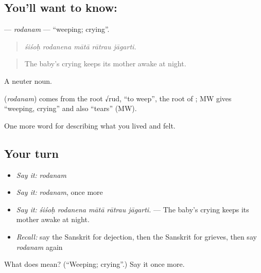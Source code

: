 \subsection*{You'll want to know: }
\textbf{} — \emph{rodanam} — \textquotedblleft{}weeping; crying\textquotedblright{}.

\begin{quote}
    
\end{quote}

\begin{quote}
\emph{śiśoḥ rodanena mātā rātrau jāgarti.}
\end{quote}

\begin{quote}
The baby's crying keeps its mother awake at night.
\end{quote}

A neuter noun.

\begin{cousinweb}
\textbf{} (\emph{rodanam}) comes from the root √rud, \textquotedblleft{}to weep\textquotedblright{}, the root of \textbf{}; MW gives \textquotedblleft{}weeping, crying\textquotedblright{} and also \textquotedblleft{}tears\textquotedblright{} (MW).
\end{cousinweb}

\begin{grammarlens}[title={What you've built}]
One more word for describing what you lived and felt.
\end{grammarlens}

\subsection*{Your turn}
\begin{itemize}
\raggedright
  \item \emph{Say it:} \emph{rodanam}
  \item \emph{Say it:} \emph{rodanam}, once more
  \item \emph{Say it:} \emph{śiśoḥ rodanena mātā rātrau jāgarti.} — The baby's crying keeps its mother awake at night.
  \item \emph{Recall:} say the Sanskrit for dejection, then the Sanskrit for grieves, then say \emph{rodanam} again
\end{itemize}

\begin{tcolorbox}[breakable,colback=teal!4,colframe=teal!35!black,title={Before you move on}]
What does  mean? (\textquotedblleft{}Weeping; crying\textquotedblright{}.) Say it once more.
\end{tcolorbox}
